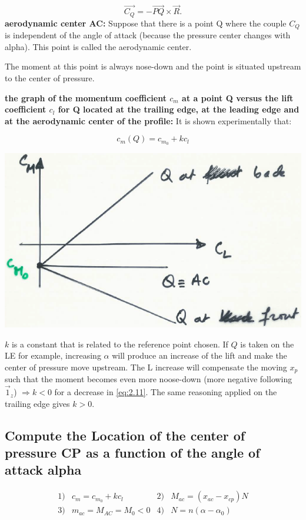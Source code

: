 \documentclass[british,french,11pt, a4paper, openany]{article}
\begin{document}
\begin{equation}
\vec{C_Q} = -\vec{PQ}\times \vec{R}.
\end{equation}
\textbf{aerodynamic center AC:} Suppose that there is a point Q where the couple $C_Q$ is independent of the angle of attack (because the pressure center changes with alpha). This point is called the aerodynamic center.

The moment at this point is always nose-down and the point is situated upstream to the center of pressure.

\textbf{the graph of the momentum coefficient $c_m$ at a point Q versus the
	lift coefficient $c_l$ for Q located at the trailing edge, at the leading edge and at
	the aerodynamic center of the profile:} It is shown experimentally that:

\begin{equation}
c_m(Q) = c_{m_0} + k c_l
\label{eq:2.11}
\end{equation}

\begin{center}
	\includegraphics[scale=0.23]{ch2/14}
\end{center}
$k$ is a constant that is related to the reference point chosen. If $Q$ is taken on the LE for example, increasing $\alpha$ will produce an increase of the lift and make the center of pressure move upstream. The L increase will compensate the moving $x_p$ such that the moment becomes even more noose-down (more negative following $\vec{1}_z$) $\Rightarrow k<0$ for a decrease in \eqref{eq:2.11}. The same reasoning applied on the trailing edge gives $k>0$. 
\subsection{Compute the Location of the center of pressure CP as a function of the angle of	attack alpha}
\begin{equation}
\begin{array}{cccc}
1) & c_m = c_{m_0} + kc_l & 2)& M_{ac} = (x_{ac}-x_{cp})N \\
3) & m_{ac} = M_{AC} = M_0 <0 & 4) & N = n(\alpha-\alpha _0)
\end{array}
\end{equation}
\end{document}

